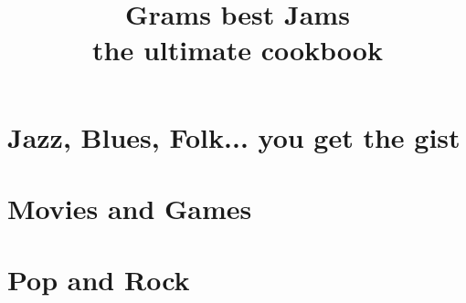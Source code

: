 \documentclass{book}
\title{Grams best Jams\\the ultimate cookbook}
\author{}
\date{}
\begin{document}
\maketitle
\frontmatter
\tableofcontents

\part{Jazz, Blues, Folk... you get the gist}







\part{Movies and Games}



\part{Pop and Rock}







\
\end{document}
